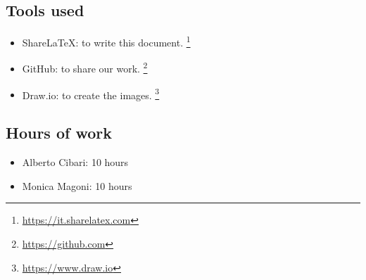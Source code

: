 \subsection*{Tools used}
    \begin{itemize}
        \item ShareLaTeX: to write this document.
        \footnote{\url{https://it.sharelatex.com}}
        \item GitHub: to share our work. \footnote{\url{https://github.com}} 
        \item Draw.io: to create the images.
        \footnote{\url{https://www.draw.io}}
    \end{itemize}
    
\subsection*{Hours of work}
    \begin{itemize}
    \item Alberto Cibari: 10 hours
    \item Monica Magoni: 10 hours
    \end{itemize}
